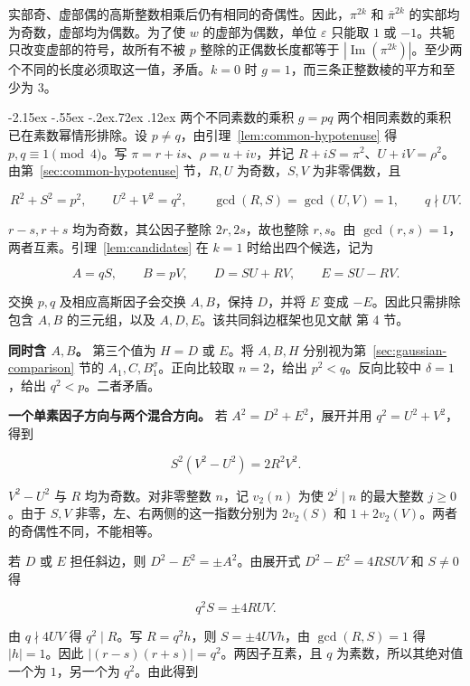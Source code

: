 \documentclass[11pt,a4paper,twoside]{article}
\makeatletter
\numberwithin{equation}{section}
\renewcommand{\subsection}{\@startsection{subsection}{2}{\z@}%
  {-2.15ex \@plus -.55ex \@minus -.2ex}{.72ex \@plus .12ex}%
  {\normalfont\normalsize\bfseries}}
\makeatother
\begin{document}
实部奇、虚部偶的高斯整数相乘后仍有相同的奇偶性。因此，\(\pi^{2k}\) 和 \(\bar\pi^{2k}\) 的实部均为奇数，虚部均为偶数。为了使 \(w\) 的虚部为偶数，单位 \(\varepsilon\) 只能取 \(1\) 或 \(-1\)。共轭只改变虚部的符号，故所有不被 \(p\) 整除的正偶数长度都等于 \(|\operatorname{Im}(\pi^{2k})|\)。至少两个不同的长度必须取这一值，矛盾。\(k=0\) 时 \(g=1\)，而三条正整数棱的平方和至少为 \(3\)。

\subsection{两个不同素数的乘积 \texorpdfstring{\(g=pq\)}{g=pq}}
两个相同素数的乘积已在素数幂情形排除。设 \(p\ne q\)，由引理~\ref{lem:common-hypotenuse} 得 \(p,q\equiv1\pmod4\)。写 \(\pi=r+is\)、\(\rho=u+iv\)，并记 \(R+iS=\pi^2\)、\(U+iV=\rho^2\)。由第~\ref{sec:common-hypotenuse} 节，\(R,U\) 为奇数，\(S,V\) 为非零偶数，且

\[
R^2+S^2=p^2,\qquad U^2+V^2=q^2,\qquad \gcd(R,S)=\gcd(U,V)=1,\qquad q\nmid UV.
\]

\(r-s,r+s\) 均为奇数，其公因子整除 \(2r,2s\)，故也整除 \(r,s\)。由 \(\gcd(r,s)=1\)，两者互素。引理~\ref{lem:candidates} 在 \(k=1\) 时给出四个候选，记为

\[
A=qS,\qquad B=pV,\qquad D=SU+RV,\qquad E=SU-RV.
\]

交换 \(p,q\) 及相应高斯因子会交换 \(A,B\)，保持 \(D\)，并将 \(E\) 变成 \(-E\)。因此只需排除包含 \(A,B\) 的三元组，以及 \(A,D,E\)。该共同斜边框架也见文献 \cite{ref2} 第 4 节。

\textbf{同时含 \(A,B\)。} 第三个值为 \(H=D\) 或 \(E\)。将 \(A,B,H\) 分别视为第~\ref{sec:gaussian-comparison} 节的 \(A_1,C,B_1^\sigma\)。正向比较取 \(n=2\)，给出 \(p^2<q\)。反向比较中 \(\delta=1\)，给出 \(q^2<p\)。二者矛盾。

\textbf{一个单素因子方向与两个混合方向。} 若 \(A^2=D^2+E^2\)，展开并用 \(q^2=U^2+V^2\)，得到

\[
S^2(V^2-U^2)=2R^2V^2.
\]

\(V^2-U^2\) 与 \(R\) 均为奇数。对非零整数 \(n\)，记 \(v_2(n)\) 为使 \(2^j\mid n\) 的最大整数 \(j\ge0\)。由于 \(S,V\) 非零，左、右两侧的这一指数分别为 \(2v_2(S)\) 和 \(1+2v_2(V)\)。两者的奇偶性不同，不能相等。

若 \(D\) 或 \(E\) 担任斜边，则 \(D^2-E^2=\pm A^2\)。由展开式 \(D^2-E^2=4RSUV\) 和 \(S\ne0\) 得

\[
q^2S=\pm4RUV.
\]

由 \(q\nmid4UV\) 得 \(q^2\mid R\)。写 \(R=q^2h\)，则 \(S=\pm4UVh\)，由 \(\gcd(R,S)=1\) 得 \(|h|=1\)。因此 \(|(r-s)(r+s)|=q^2\)。两因子互素，且 \(q\) 为素数，所以其绝对值一个为 \(1\)，另一个为 \(q^2\)。由此得到
\end{document}
